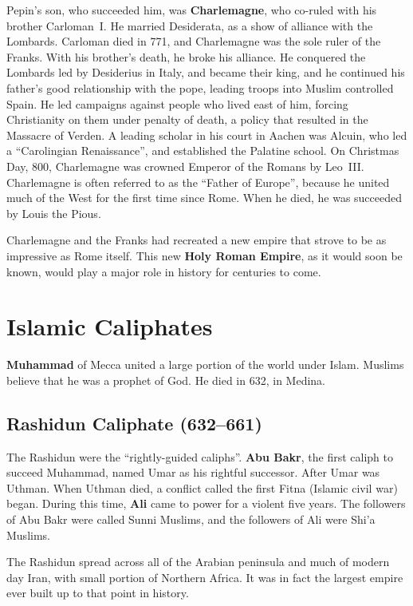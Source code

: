 Pepin's son, who succeeded him, was \textbf{Charlemagne}, who co-ruled with his brother Carloman~I.
He married Desiderata, as a show of alliance with the Lombards.
Carloman died in 771, and Charlemagne was the sole ruler of the Franks.
With his brother's death, he broke his alliance.
He conquered the Lombards led by Desiderius in Italy, and became their king,
and he continued his father's good relationship with the pope,
leading troops into Muslim controlled Spain.
He led campaigns against people who lived east of him, forcing Christianity on them under penalty of death,
a policy that resulted in the Massacre of Verden.
A leading scholar in his court in Aachen was Alcuin,
who led a ``Carolingian Renaissance'', and established the Palatine school.
On Christmas Day, 800, Charlemagne was crowned Emperor of the Romans by Leo~III\@.
Charlemagne is often referred to as the ``Father of Europe'',
because he united much of the West for the first time since Rome.
When he died, he was succeeded by Louis the Pious.

Charlemagne and the Franks had recreated a new empire that strove to be as impressive as Rome itself.
This new \textbf{Holy Roman Empire}, as it would soon be known,
would play a major role in history for centuries to come.

\section{Islamic Caliphates}

\textbf{Muhammad} of Mecca united a large portion of the world under Islam.
Muslims believe that he was a prophet of God.
He died in 632, in Medina.

\subsection*{Rashidun Caliphate (632--661)}

The Rashidun were the ``rightly-guided caliphs''.
\textbf{Abu Bakr}, the first caliph to succeed Muhammad, named Umar as his rightful successor.
After Umar was Uthman.
When Uthman died, a conflict called the first Fitna (Islamic civil war) began.
During this time, \textbf{Ali} came to power for a violent five years.
The followers of Abu Bakr were called Sunni Muslims, and the followers of Ali were Shi'a Muslims.

The Rashidun spread across all of the Arabian peninsula and much of modern day Iran,
with small portion of Northern Africa.
It was in fact the largest empire ever built up to that point in history.


